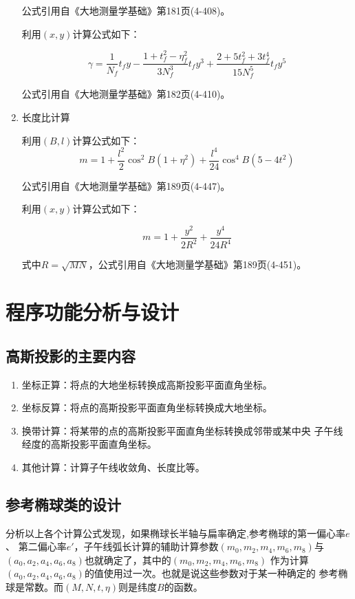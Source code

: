 \begin{enumerate}
公式引用自《大地测量学基础》第181页(4-408)。

利用$(x, y)$计算公式如下：

$$\gamma = \frac{1}{N_f}t_f y - \frac{1+t_f ^2 - \eta_f ^2}{3N_f ^3}t_f y^3
+ \frac{2+5t_f^2+3t_f^4}{15N_f ^5}t_fy^5$$

公式引用自《大地测量学基础》第182页(4-410)。

\item 长度比计算

利用$(B, l)$计算公式如下：
$$m=1+\frac{l^2}{2} \cos ^2 B(1+\eta^2) + \frac{l^4}{24}\cos ^4 B(5-4t^2)$$

公式引用自《大地测量学基础》第189页(4-447)。

利用$(x, y)$计算公式如下：

$$m=1+\frac{y^2}{2R^2} + \frac{y^4}{24R^4}$$

式中$R=\sqrt{MN}$，公式引用自《大地测量学基础》第189页(4-451)。

\end{enumerate}

\section{程序功能分析与设计}

\subsection{高斯投影的主要内容}
\begin{enumerate}
    \item 坐标正算：将点的大地坐标转换成高斯投影平面直角坐标。
    \item 坐标反算：将点的高斯投影平面直角坐标转换成大地坐标。
    \item 换带计算：将某带的点的高斯投影平面直角坐标转换成邻带或某中央
    子午线经度的高斯投影平面直角坐标。
    \item 其他计算：计算子午线收敛角、长度比等。
\end{enumerate}

\subsection{参考椭球类的设计}

分析以上各个计算公式发现，如果椭球长半轴与扁率确定,参考椭球的第一偏心率$e$、
第二偏心率$e'$，子午线弧长计算的辅助计算参数$(m_0, m_2, m_4, m_6, m_8)$与
$(a_0, a_2, a_4, a_6, a_8)$也就确定了，其中的$(m_0, m_2, m_4, m_6, m_8)$
作为计算$(a_0, a_2, a_4, a_6, a_8)$的值使用过一次。也就是说这些参数对于某一种确定的
参考椭球是常数。而$(M,N,t,\eta)$则是纬度$B$的函数。

